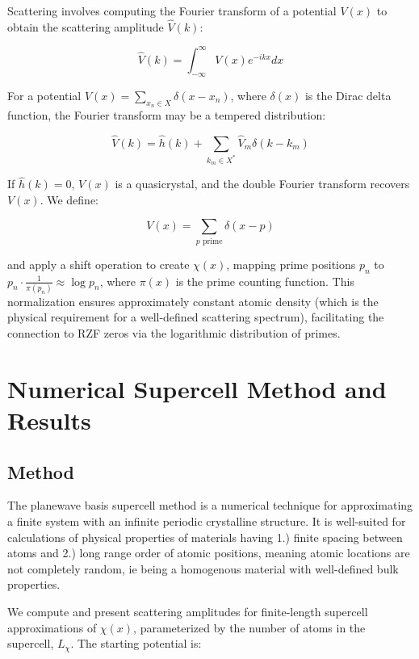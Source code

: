 \documentclass[11pt, oneside]{article}
\begin{document}
Scattering involves computing the Fourier transform of a potential $V(x)$ to obtain the scattering amplitude $\hat{V}(k)$:

\begin{equation}
\hat{V}(k) = \int_{-\infty}^{\infty} V(x) e^{-i k x} dx
\end{equation}

For a potential $V(x) = \sum_{x_n \in X} \delta(x - x_n)$, where $\delta(x)$ is the Dirac delta function, the Fourier transform may be a tempered distribution:

\begin{equation}
\hat{V}(k) = \hat{h}(k) + \sum_{k_m \in X^{*}} \hat{V}_{m} \delta(k - k_m)
\end{equation}

If $\hat{h}(k) = 0$, $V(x)$ is a quasicrystal, and the double Fourier transform recovers $V(x)$. We define:

\begin{equation}
V(x) = \sum_{p \text{ prime}} \delta(x - p)
\end{equation}

and apply a shift operation to create $\chi(x)$, mapping prime positions $p_n$ to $p_n \cdot \frac{1}{\pi(p_n)} \approx \log p_n$, where $\pi(x)$ is the prime counting function. This normalization ensures approximately constant atomic density (which is the physical requirement for a well-defined scattering spectrum), facilitating the connection to RZF zeros via the logarithmic distribution of primes.

\section{Numerical Supercell Method and Results}

\subsection{Method}

The planewave basis supercell method is a numerical technique for approximating a finite system with an infinite periodic crystalline structure. It is well-suited for calculations of physical properties of materials having 1.) finite spacing between atoms and 2.) long range order of atomic positions, meaning atomic locations are not completely random, ie being a homogenous material with well-defined bulk properties.
  
We compute and present scattering amplitudes for finite-length supercell approximations of $\chi(x)$, parameterized by the number of atoms in the supercell, $L_{\chi}$. The starting potential is:
\end{document}
